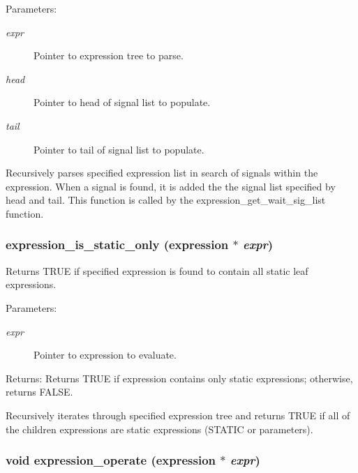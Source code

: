 \begin{Desc}
\item[Parameters:]
\begin{description}
\item[{\em expr}]Pointer to expression tree to parse. \item[{\em head}]Pointer to head of signal list to populate. \item[{\em tail}]Pointer to tail of signal list to populate.\end{description}
\end{Desc}
Recursively parses specified expression list in search of signals within the expression. When a signal is found, it is added the the signal list specified by head and tail. This function is called by the expression\_\-get\_\-wait\_\-sig\_\-list function. 
\subsubsection{ expression\_\-is\_\-static\_\-only ({\bf expression} $\ast$ {\em expr})}\label{expr_8c_a24}


Returns TRUE if specified expression is found to contain all static leaf expressions. 

\begin{Desc}
\item[Parameters:]
\begin{description}
\item[{\em expr}]Pointer to expression to evaluate.\end{description}
\end{Desc}
\begin{Desc}
\item[Returns:]Returns TRUE if expression contains only static expressions; otherwise, returns FALSE.\end{Desc}
Recursively iterates through specified expression tree and returns TRUE if all of the children expressions are static expressions (STATIC or parameters). 
\subsubsection{\setlength{\rightskip}{0pt plus 5cm}void expression\_\-operate ({\bf expression} $\ast$ {\em expr})}\label{expr_8c_a21}


